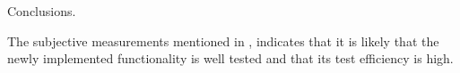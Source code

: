 Conclusions.

The subjective measurements mentioned in ,
indicates that it is likely that the newly implemented functionality is
well tested and that its test efficiency is high.
